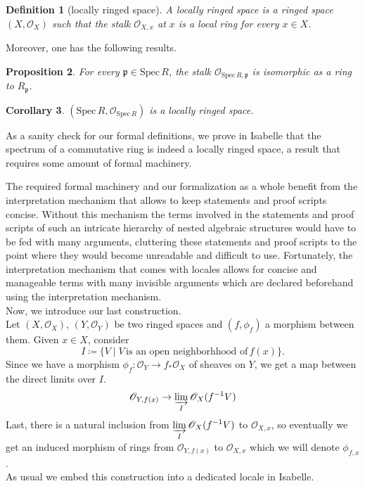 \documentclass[12pt]{scrartcl}
\newtheorem{proposition}{Proposition}[section]
\newtheorem{definition}[proposition]{Definition}
\newtheorem{cor}[proposition]{Corollary}
\def\spec{\text{Spec}\,R}
\begin{document}
\begin{definition}[locally ringed space]
	A locally ringed space is a ringed space $(X, \mathscr{O}_X)$ such that the stalk $\mathscr{O}_{X, x}$ at $x$ is a local ring for every $x \in X$.
\end{definition}


Moreover, one has the following results.

\begin{proposition}
	For every $\mathfrak{p} \in \text{Spec}\,R$, the stalk $\mathscr{O}_{\spec, \mathfrak{p}}$ is isomorphic as a ring to $R_{\mathfrak{p}}$.	
\end{proposition}	

	
\begin{cor}
	$(\text{Spec}\,R, \mathscr{O}_{\spec})$ is a locally ringed space.
\end{cor}

As a sanity check for our formal definitions, we prove in Isabelle that the spectrum of a commutative ring is indeed a locally ringed space, a result that requires some amount of formal machinery.


The required formal machinery and our formalization as a whole benefit from the interpretation mechanism that allows to keep statements and proof scripts concise. Without this mechanism the terms involved in the statements and proof scripts of such an intricate hierarchy of nested algebraic structures would have to be fed with many arguments, cluttering these statements and proof scripts to the point where they would become unreadable and difficult to use. Fortunately, the interpretation mechanism that comes with locales allows for concise and manageable terms with many invisible arguments which are declared beforehand using the interpretation mechanism. \\   
Now, we introduce our last construction. \\
	Let $(X, \mathscr{O}_X)$, $(Y, \mathscr{O}_Y)$ be two ringed spaces and $(f, \phi_f)$ a morphism between them. Given $x \in X$, consider 
	\[
	I \coloneqq \lbrace V \mid V \, \text{is an open neighborhhood of}\, f(x) \rbrace .
	\]
	Since we have a morphism $\phi_f: \mathscr{O}_Y \rightarrow f_* \mathscr{O}_X $ of sheaves on $Y$, we get a map between the direct limits over $I$. 
	\[
	\mathscr{O}_{Y, f(x)} \rightarrow \displaystyle \varinjlim_I \mathscr{O}_X (f^{-1} V)
	\]
	Last, there is a natural inclusion from $\displaystyle \varinjlim_I \mathscr{O}_X (f^{-1} V)$ to $\mathscr{O}_{X, x}$, so eventually we get an induced morphism of rings from $\mathscr{O}_{Y, f(x)}$ to $\mathscr{O}_{X, x}$ which we will denote $\phi_{f, x}$. \\	
As usual we embed this construction into a dedicated locale in Isabelle.
\end{document}
